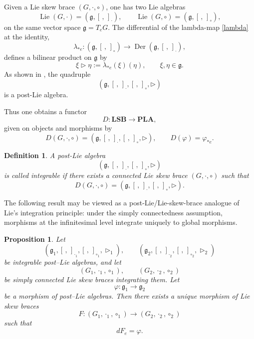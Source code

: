\documentclass[reqno]{amsart}
\newtheorem{definition}[theorem]{Definition}
\newtheorem{proposition}[theorem]{Proposition}
\newcommand{\g}{\mathfrak{g}}
\DeclareMathOperator{\Lie}{Lie}
\DeclareMathOperator{\Der}{Der}
\begin{document}
\medskip
Given a Lie skew brace $(G,\cdot,\circ)$, one has two Lie algebras
\[
\Lie(G,\cdot)=(\g,[\, ,\,]_{\cdot}),
\qquad
\Lie(G,\circ)=(\g,[\, ,\,]_{\circ}),
\]
on the same vector space $\g=T_eG$. The differential of the lambda-map
\eqref{lambda} at the identity,
\[
\lambda_{*e}:(\g,[\, ,\,]_{\circ})\longrightarrow
\Der(\g,[\, ,\,]_{\cdot}),
\]
defines a bilinear product on $\g$ by
\begin{equation}\label{trianglelambda}
\xi\triangleright \eta:=\lambda_{*e}(\xi)(\eta),
\qquad \xi,\eta\in\g.
\end{equation}
As shown in \cite{BaiGuoShengTang2023}, the quadruple
\[
(\g,[\, ,\,]_{\cdot},[\, ,\,]_{\circ},\triangleright)
\]
is a post-Lie algebra.

Thus one obtains a functor
\[
D:\mathbf{LSB}\to \mathbf{PLA},
\]
given on objects and morphisms by
\[
D(G,\cdot,\circ)
=
(\g,[\, ,\,]_{\cdot},[\, ,\,]_{\circ},\triangleright),
\qquad
D(\varphi)=\varphi_{*e}.
\]

\begin{definition}
A post-Lie algebra
\[
(\g,[\, ,\,]_{\cdot},[\, ,\,]_{\circ},\triangleright)
\]
is called \emph{integrable} if there exists a connected Lie skew brace
$(G,\cdot,\circ)$ such that
\[
D(G,\cdot,\circ)=
(\g,[\, ,\,]_{\cdot},[\, ,\,]_{\circ},\triangleright).
\]
\end{definition}

The following result may be viewed as a post-Lie/Lie-skew-brace analogue of
Lie's integration principle: under the simply connectedness assumption,
morphisms at the infinitesimal level integrate uniquely to global morphisms.
\begin{proposition}\label{prop:integration-morphisms-PLA}
Let
\[
(\mathfrak g_1,[\, ,\,]_{\cdot_1},[\, ,\,]_{\circ_1},\triangleright_1), \qquad
(\mathfrak g_2,[\, ,\,]_{\cdot_2},[\, ,\,]_{\circ_2},\triangleright_2)
\]
be integrable post--Lie algebras, and let
\[
(G_1,\cdot_1,\circ_1), \qquad (G_2,\cdot_2,\circ_2)
\]
be simply connected Lie skew braces integrating them. Let
\[
\varphi:\mathfrak g_1 \longrightarrow \mathfrak g_2
\]
be a morphism of post--Lie algebras. Then there exists a unique morphism of Lie skew braces
\[
F:(G_1,\cdot_1,\circ_1)\longrightarrow (G_2,\cdot_2,\circ_2)
\]
such that
\[
dF_e=\varphi.
\]
\end{proposition}
\end{document}
